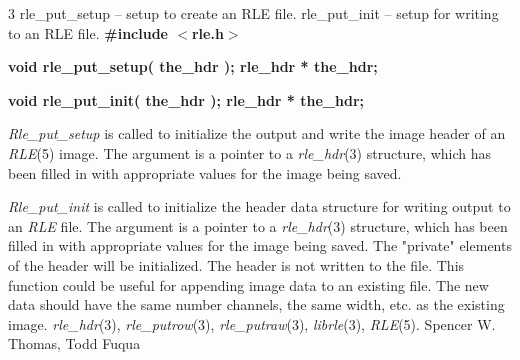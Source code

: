 %
%
%
 3
rle\_put\_setup -- setup to create an RLE file.
\nwl
rle\_put\_init -- setup for writing to an RLE file.
\bf
\#include $<$rle.h$>$
\par\vspace{1.0\baselineskip}
\bf
void rle\_put\_setup( the\_hdr );
\nwl
\bf
rle\_hdr * the\_hdr;
\par\vspace{1.0\baselineskip}
\bf
void rle\_put\_init( the\_hdr );
\nwl
\bf
rle\_hdr * the\_hdr;

{\it Rle\_put\_setup}
is called to initialize the output and write the image header of
an
{\it RLE}{\rm (5)}
image.
The argument is a pointer to a 
{\it rle\_hdr}{\rm (3)}
structure, which has been filled in with appropriate values for the
image being saved.

{\it Rle\_put\_init}
is called to initialize the header data structure for writing output to an
{\it RLE}
file.
The argument is a pointer to a 
{\it rle\_hdr}{\rm (3)}
structure, which has been filled in with appropriate values for the
image being saved.  The "private" elements of the header will be
initialized.  The header is not written to the file.
This function could be useful for appending image data
to an existing file.  The new data should have the same number
channels, the same width, etc. as the existing image.
{\it rle\_hdr}{\rm (3),}
{\it rle\_putrow}{\rm (3),}
{\it rle\_putraw}{\rm (3),}
{\it librle}{\rm (3),}
{\it RLE}{\rm (5).}
Spencer W. Thomas, Todd Fuqua
\newpage


